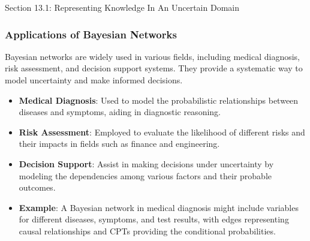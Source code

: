 \begin{notes}{Section 13.1: Representing Knowledge In An Uncertain Domain}
    \subsubsection*{Applications of Bayesian Networks}
    
    Bayesian networks are widely used in various fields, including medical diagnosis, risk assessment, and decision support systems. They provide a systematic way to model uncertainty and make informed 
    decisions.
    
    \begin{highlight}
    
        \begin{itemize}
            \item \textbf{Medical Diagnosis}: Used to model the probabilistic relationships between diseases and symptoms, aiding in diagnostic reasoning.
            \item \textbf{Risk Assessment}: Employed to evaluate the likelihood of different risks and their impacts in fields such as finance and engineering.
            \item \textbf{Decision Support}: Assist in making decisions under uncertainty by modeling the dependencies among various factors and their probable outcomes.
            \item \textbf{Example}: A Bayesian network in medical diagnosis might include variables for different diseases, symptoms, and test results, with edges representing causal relationships and 
            CPTs providing the conditional probabilities.
        \end{itemize}
    
    \end{highlight}
    
    \begin{highlight}
    

\end{highlight}
\end{notes}
